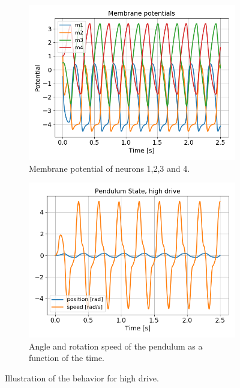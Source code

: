 \documentclass{cmc}
\begin{document}
\begin{figure}[ht]
  \begin{subfigure}[b]{0.48\textwidth}
    \includegraphics[width=\textwidth]{figures/Exercise3/MembranePotentialshighdrive.png}
    \caption{Membrane potential of neurons 1,2,3 and 4.}
    \label{fig:ex3-membrane-high}
  \end{subfigure}
  \begin{subfigure}[b]{0.48\textwidth}
    \includegraphics[width=\textwidth]{figures/Exercise3/PendulumStatehighdrive.png}
    \caption{Angle and rotation speed of the pendulum as a function of the time.}
    \label{fig:ex3-state-high}
  \end{subfigure}
  \caption{Illustration of the behavior for high drive.}
  \label{fig:ex3-high}
\end{figure}
\end{document}
